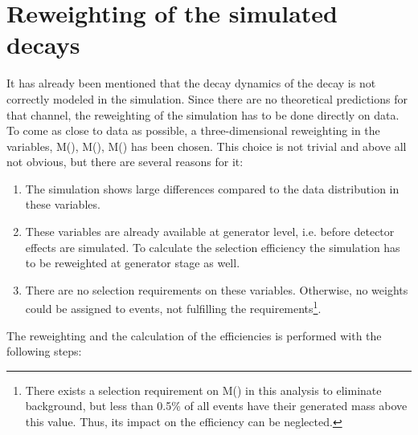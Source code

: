 \section{Reweighting of the simulated \LbToDpmunuX decays}
\label{sec:Reweight_D0p}
It has already been mentioned that the decay dynamics of the \LbToDpmunuX decay is not correctly modeled in the simulation.
Since there are no theoretical predictions for that channel, the reweighting of the simulation has to be done directly on data.
To come as close to data as possible, a three-dimensional reweighting in the variables, M(\Dz\proton), M(\Dz\mun), M(\Dz\proton\mun) has been chosen. 
This choice is not trivial and above all not obvious, but there are several reasons for it:
\begin{enumerate}
    \item The simulation shows large differences compared to the data distribution in these variables.
    \item These variables are already available at generator level, i.e. before detector effects are simulated. 
          To calculate the selection efficiency the simulation has to be reweighted at generator stage as well.
    \item There are no selection requirements on these variables. 
          Otherwise, no weights could be assigned to events, not fulfilling the requirements\footnote{There exists a selection requirement on M(\Dz\proton\mun) in this analysis to eliminate \decay{\Lb}{\Dz\proton\pim} background, but less than 0.5\% of all events have their generated mass above this value. 
                    Thus, its impact on the efficiency can be neglected.}.
\end{enumerate}
The reweighting and the calculation of the efficiencies is performed with the following steps:
